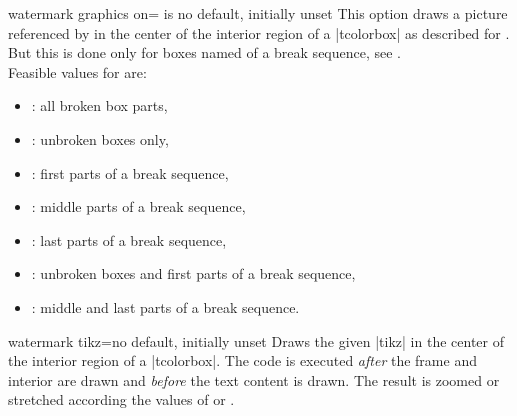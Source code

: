 \begin{docTcbKey}{watermark graphics on}{= is }{no default, initially unset}
  This option draws a picture referenced by  in the center of the interior region of a |tcolorbox|
  as described for .
  But this is done only for boxes named  of a break sequence, see
  .\\ 
  Feasible values for  are:
  \begin{itemize}
  \item{}: all broken box parts,
  \item{}: unbroken boxes only,
  \item{}: first parts of a break sequence,
  \item{}: middle parts of a break sequence,
  \item{}: last parts of a break sequence,
  \item{}: unbroken boxes and first parts of a break sequence,
  \item{}: middle and last parts of a break sequence.
  \end{itemize}
\end{docTcbKey}



\clearpage
\begin{docTcbKey}{watermark tikz}{=}{no default, initially unset}
  Draws the given |tikz| 
  in the center of the interior region of a |tcolorbox|.
  The code is executed \emph{after} the
  frame and interior are drawn and \emph{before} the text content is drawn.
  The result is zoomed or stretched according the values of
   or .
\begin{dispExample}

\begin{tcolorbox}[enhanced,title=My title,
  watermark tikz={\draw[line width=2mm] circle (1cm)
    node{\fontfamily{ptm}\fontseries{b}\fontsize{20mm}{20mm}\selectfont ?};}]
\lipsum[1]
\tcblower
\lipsum[2]
\end{tcolorbox}
\end{dispExample}
\end{docTcbKey}



